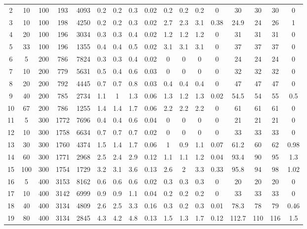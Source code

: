 \documentclass[11pt]{article}
\begin{document}
\begin{landscape}
\begin{longtable}[c]{ccccc|cccc|cccc|cccc}
		2 & 10 & 100 & 193 & 4093 & 0.2 & 0.2 & 0.3 & 0.02 & 0.2 & 0.2 & 0.2 & 0 & 30 & 30 & 30 & 0 \\
		\rowcolor[HTML]{EFEFEF} 
		3 & 10 & 100 & 198 & 4250 & 0.2 & 0.2 & 0.3 & 0.02 & 2.7 & 2.3 & 3.1 & 0.38 & 24.9 & 24 & 26 & 1 \\
		\rowcolor[HTML]{EFEFEF} 
		4 & 20 & 100 & 196 & 3034 & 0.3 & 0.3 & 0.4 & 0.02 & 1.2 & 1.2 & 1.2 & 0 & 31 & 31 & 31 & 0 \\
		\rowcolor[HTML]{EFEFEF} 
		5 & 33 & 100 & 196 & 1355 & 0.4 & 0.4 & 0.5 & 0.02 & 3.1 & 3.1 & 3.1 & 0 & 37 & 37 & 37 & 0 \\
		6 & 5 & 200 & 786 & 7824 & 0.3 & 0.3 & 0.4 & 0.02 & 0 & 0 & 0 & 0 & 24 & 24 & 24 & 0 \\
		7 & 10 & 200 & 779 & 5631 & 0.5 & 0.4 & 0.6 & 0.03 & 0 & 0 & 0 & 0 & 32 & 32 & 32 & 0 \\
		8 & 20 & 200 & 792 & 4445 & 0.7 & 0.7 & 0.8 & 0.03 & 0.4 & 0.4 & 0.4 & 0 & 47 & 47 & 47 & 0 \\
		9 & 40 & 200 & 785 & 2734 & 1.1 & 1 & 1.3 & 0.06 & 1.3 & 1.2 & 1.3 & 0.02 & 54.5 & 54 & 55 & 0.5 \\
		10 & 67 & 200 & 786 & 1255 & 1.4 & 1.4 & 1.7 & 0.06 & 2.2 & 2.2 & 2.2 & 0 & 61 & 61 & 61 & 0 \\
		\rowcolor[HTML]{EFEFEF} 
		11 & 5 & 300 & 1772 & 7696 & 0.4 & 0.4 & 0.6 & 0.04 & 0 & 0 & 0 & 0 & 21 & 21 & 21 & 0 \\
		\rowcolor[HTML]{EFEFEF} 
		12 & 10 & 300 & 1758 & 6634 & 0.7 & 0.7 & 0.7 & 0.02 & 0 & 0 & 0 & 0 & 33 & 33 & 33 & 0 \\
		\rowcolor[HTML]{EFEFEF} 
		13 & 30 & 300 & 1760 & 4374 & 1.5 & 1.4 & 1.7 & 0.06 & 1 & 0.9 & 1.1 & 0.07 & 61.2 & 60 & 62 & 0.98 \\
		\rowcolor[HTML]{EFEFEF} 
		14 & 60 & 300 & 1771 & 2968 & 2.5 & 2.4 & 2.9 & 0.12 & 1.1 & 1.1 & 1.2 & 0.04 & 93.4 & 90 & 95 & 1.3 \\
		\rowcolor[HTML]{EFEFEF} 
		15 & 100 & 300 & 1754 & 1729 & 3.2 & 3.1 & 3.6 & 0.13 & 2.6 & 2 & 3.3 & 0.33 & 95.8 & 94 & 98 & 1.02 \\
		16 & 5 & 400 & 3153 & 8162 & 0.6 & 0.6 & 0.6 & 0.02 & 0.3 & 0.3 & 0.3 & 0 & 20 & 20 & 20 & 0 \\
		17 & 10 & 400 & 3142 & 6999 & 0.9 & 0.9 & 1.1 & 0.04 & 0.2 & 0.2 & 0.2 & 0 & 33 & 33 & 33 & 0 \\
		18 & 40 & 400 & 3134 & 4809 & 2.6 & 2.5 & 3.3 & 0.16 & 0.3 & 0.2 & 0.3 & 0.01 & 78.3 & 78 & 79 & 0.46 \\
		19 & 80 & 400 & 3134 & 2845 & 4.3 & 4.2 & 4.8 & 0.13 & 1.5 & 1.3 & 1.7 & 0.12 & 112.7 & 110 & 116 & 1.5 \\

\end{longtable}
\end{landscape}
\end{document}
